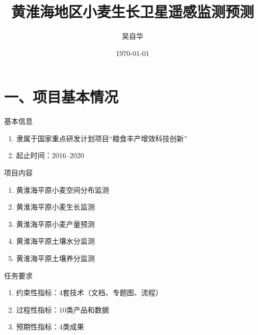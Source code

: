 \documentclass{beamer}
\title{黄淮海地区小麦生长卫星遥感监测预测}
\date{\today}
\author{吴自华}
\institute{北京大学}
\begin{document}
  \maketitle
  \section{一、项目基本情况}
  \begin{frame}{基本信息}
    \begin{enumerate}
    	\item 隶属于国家重点研发计划项目“粮食丰产增效科技创新”
    	\item 起止时间：2016--2020
    \end{enumerate}
  \end{frame}
 
\begin{frame}{项目内容}
	\begin{enumerate}
		\item 黄淮海平原小麦空间分布监测
		\item 黄淮海平原小麦生长监测
		\item 黄淮海平原小麦产量预测
		\item 黄淮海平原土壤水分监测
		\item 黄淮海平原土壤养分监测
	\end{enumerate}
\end{frame}

\begin{frame}{任务要求}
	\begin{enumerate}
		\item 约束性指标：4套技术（文档、专题图、流程）
		\item 过程性指标：10类产品和数据
		\item 预期性指标：4类成果
	\end{enumerate}
\end{frame}
\end{document}
